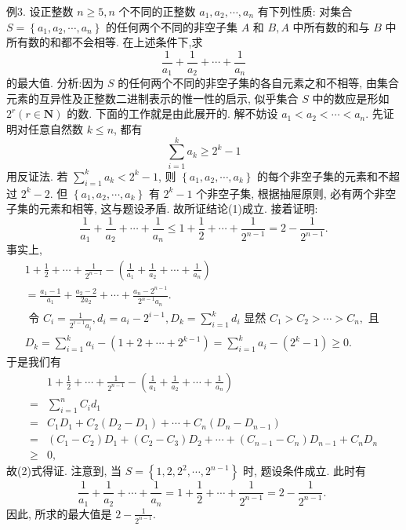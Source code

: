 例3. 设正整数 $n \geqslant 5, n$ 个不同的正整数 $a_1, a_2, \cdots, a_n$ 有下列性质: 对集合 $S=\left\{a_1, a_2, \cdots, a_n\right\}$ 的任何两个不同的非空子集 $A$ 和 $B, A$ 中所有数的和与 $B$ 中所有数的和都不会相等.
在上述条件下,求
$$
\frac{1}{a_1}+\frac{1}{a_2}+\cdots+\frac{1}{a_n}
$$
的最大值.
分析:因为 $S$ 的任何两个不同的非空子集的各自元素之和不相等, 由集合元素的互异性及正整数二进制表示的惟一性的启示, 似乎集合 $S$ 中的数应是形如 $2^r(r \in \mathbf{N})$ 的数.
下面的工作就是由此展开的.
解不妨设 $a_1<a_2<\cdots<a_n$.
先证明对任意自然数 $k \leqslant n$, 都有
$$
\sum_{i=1}^k a_k \geqslant 2^k-1
$$
用反证法.
若 $\sum_{i=1}^k a_k<2^k-1$, 则 $\left\{a_1, a_2, \cdots, a_k\right\}$ 的每个非空子集的元素和不超过 $2^k-2$. 但 $\left\{a_1, a_2, \cdots, a_k\right\}$ 有 $2^k-1$ 个非空子集, 根据抽屉原则, 必有两个非空子集的元素和相等, 这与题设矛盾.
故所证结论(1)成立.
接着证明:
$$
\frac{1}{a_1}+\frac{1}{a_2}+\cdots+\frac{1}{a_n} \leqslant 1+\frac{1}{2}+\cdots+\frac{1}{2^{n-1}}=2-\frac{1}{2^{n-1}} .
$$
事实上,
$$
\begin{gathered}
1+\frac{1}{2}+\cdots+\frac{1}{2^{n-1}}-\left(\frac{1}{a_1}+\frac{1}{a_2}+\cdots+\frac{1}{a_n}\right) \\
=\frac{a_1-1}{a_1}+\frac{a_2-2}{2 a_2}+\cdots+\frac{a_n-2^{n-1}}{2^{n-1} a_n} . \\
\text { 令 } C_i=\frac{1}{2^{i-1} a_i}, d_i=a_i-2^{i-1}, D_k=\sum_{i=1}^k d_i \text { 显然 } C_1>C_2>\cdots>C_n, \text { 且 } \\
D_k=\sum_{i=1}^k a_i-\left(1+2+\cdots+2^{k-1}\right)=\sum_{i=1}^k a_i-\left(2^k-1\right) \geqslant 0 .
\end{gathered}
$$
于是我们有
$$
\begin{aligned}
& 1+\frac{1}{2}+\cdots+\frac{1}{2^{n-1}}-\left(\frac{1}{a_1}+\frac{1}{a_2}+\cdots+\frac{1}{a_n}\right) \\
= & \sum_{i=1}^n C_i d_1 \\
= & C_1 D_1+C_2\left(D_2-D_1\right)+\cdots+C_n\left(D_n-D_{n-1}\right) \\
= & \left(C_1-C_2\right) D_1+\left(C_2-C_3\right) D_2+\cdots+\left(C_{n-1}-C_n\right) D_{n-1}+C_n D_n \\
\geqslant & 0,
\end{aligned}
$$
故(2)式得证.
注意到, 当 $S=\left\{1,2,2^2, \cdots, 2^{n-1}\right\}$ 时, 题设条件成立.
此时有
$$
\frac{1}{a_1}+\frac{1}{a_2}+\cdots+\frac{1}{a_n}=1+\frac{1}{2}+\cdots+\frac{1}{2^{n-1}}=2-\frac{1}{2^{n-1}} \text {. }
$$
因此, 所求的最大值是 $2-\frac{1}{2^{n-1}}$.



